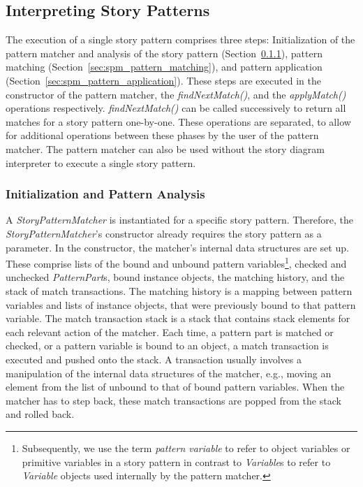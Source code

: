 \subsection{Interpreting Story Patterns}
\label{sec:interpreting_story_patterns}

The execution of a single story pattern comprises three steps:
Initialization of the pattern matcher and analysis of the story pattern (Section~\ref{sec:spm_initialization}),
pattern matching (Section~\ref{sec:spm_pattern_matching}),
and pattern application (Section~\ref{sec:spm_pattern_application}).
These steps are executed in the constructor of the pattern matcher, the \emph{findNextMatch()}, and the \emph{applyMatch()} operations respectively.
\emph{findNextMatch()} can be called successively to return all matches for a story pattern one-by-one.
These operations are separated, to allow for additional operations between these phases by the user of the pattern matcher.
The pattern matcher can also be used without the story diagram interpreter to execute a single story pattern.


\subsubsection{Initialization and Pattern Analysis}
\label{sec:spm_initialization}

A \emph{StoryPatternMatcher} is instantiated for a specific story pattern. 
Therefore, the \emph{StoryPatternMatcher}'s constructor already requires the story pattern as a parameter.
In the constructor, the matcher's internal data structures are set up. 
These comprise lists of the bound and unbound pattern variables\footnote{Subsequently, we use the term \emph{pattern variable} to refer to object variables or primitive variables in a story pattern in contrast to \emph{Variable}s to refer to \emph{Variable} objects used internally by the pattern matcher.}, checked and unchecked \emph{PatternPart}s, bound instance objects, the matching history, and the stack of match transactions.
The matching history is a mapping between pattern variables and lists of instance objects, that were previously bound to that pattern variable.
The match transaction stack is a stack that contains stack elements for each relevant action of the matcher.
Each time, a pattern part is matched or checked, or a pattern variable is bound to an object, a match transaction is executed and pushed onto the stack.
A transaction usually involves a manipulation of the internal data structures of the matcher, e.g., moving an element from the list of unbound to that of bound pattern variables.
When the matcher has to step back, these match transactions are popped from the stack and rolled back.

